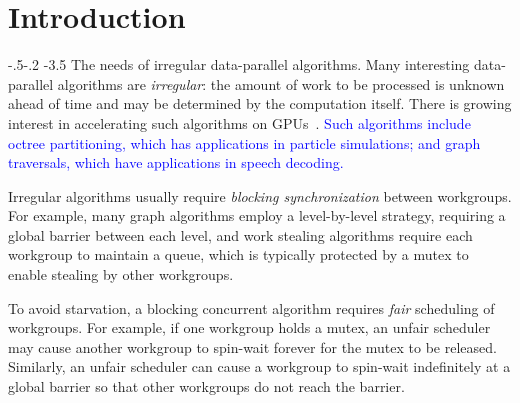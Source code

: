 \documentclass[sigconf]{acmart}
\makeatletter
\renewcommand\paragraph{\@startsection{paragraph}{4}{\z@}%
  {-.5\baselineskip \@plus -2\p@ \@minus -.2\p@}%
  {-3.5\p@}%
  {\bfseries\@parfont}}
\newcommand{\TSAdded}[1]{\textcolor{blue}{#1}}
\makeatother
\begin{document}
\maketitle

\newcommand{\myparagraph}[1]{\paragraph{#1.}}


\section{Introduction}\label{sec:intro}

\myparagraph{The needs of irregular data-parallel algorithms}
Many interesting data-parallel algorithms are \emph{irregular}: the
amount of work to be processed is unknown ahead of time and may be
determined by the computation itself.  There is growing interest in
accelerating such algorithms on
GPUs~\cite{owens-persistent,DBLP:conf/ipps/KaleemVPHP16,DBLP:conf/ipps/DavidsonBGO14,DBLP:conf/hipc/HarishN07,DBLP:journals/topc/MerrillGG15,DBLP:conf/egh/VineetHPN09,DBLP:conf/ppopp/NobariCKB12,DBLP:conf/hpcc/SolomonTT10a,DBLP:conf/popl/PrabhuRMH11,DBLP:conf/ppopp/Mendez-LojoBP12,DBLP:conf/oopsla/PaiP16,DBLP:conf/oopsla/SorensenDBGR16,DBLP:conf/egh/CedermanT08,TPO10,BNP12,Pannotia}. \TSAdded{Such
  algorithms include octree partitioning, which has applications in
  particle simulations; and graph traversals, which have applications
  in speech decoding.}

Irregular algorithms usually require \emph{blocking synchronization}
between workgroups.  For example, many graph algorithms employ a level-by-level
strategy, requiring a global barrier between each level, and work
stealing algorithms require each workgroup to maintain a queue, which
is typically protected by a mutex to enable stealing by other
workgroups.

To avoid starvation, a blocking concurrent algorithm requires
\emph{fair} scheduling of workgroups.  For
example, if one workgroup holds a mutex, an unfair scheduler may cause
another workgroup to spin-wait forever for the mutex to be
released.  Similarly, an unfair scheduler can cause a workgroup to spin-wait
indefinitely at a global barrier so that other workgroups do not reach the barrier.
\end{document}
